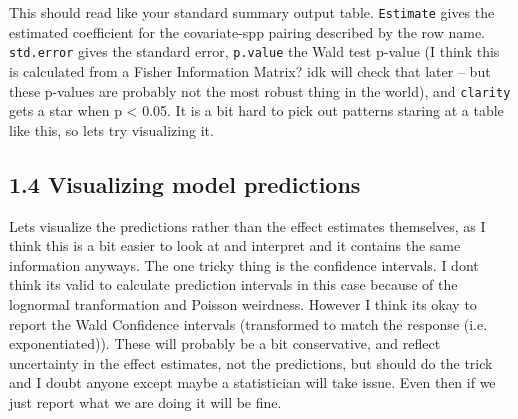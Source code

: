 \documentclass[11pt]{article}
\begin{document}
This should read like your standard summary output table. \texttt{Estimate} gives the estimated coefficient for the covariate-spp pairing described by the row name. \texttt{std.error} gives the standard error, \texttt{p.value} the Wald test p-value (I think this is calculated from a Fisher Information Matrix? idk will check that later -- but these p-values are probably not the most robust thing in the world), and \texttt{clarity} gets a star when p < 0.05. It is a bit hard to pick out patterns staring at a table like this, so lets try visualizing it.

\subsection*{1.4 Visualizing model predictions}
\label{sec:org19ac34d}

Lets visualize the predictions rather than the effect estimates themselves, as I think this is a bit easier to look at and interpret and it contains the same information anyways. The one tricky thing is the confidence intervals. I dont think its valid to calculate prediction intervals in this case because of the lognormal tranformation and Poisson weirdness. However I think its okay to report the Wald Confidence intervals (transformed to match the response (i.e. exponentiated)). These will probably be a bit conservative, and reflect uncertainty in the effect estimates, not the predictions, but should do the trick and I doubt anyone except maybe a statistician will take issue. Even then if we just report what we are doing it will be fine.
\end{document}

